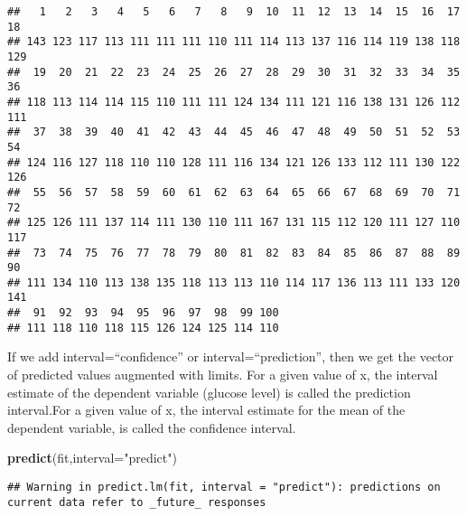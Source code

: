 \documentclass[]{book}
\newenvironment{Shaded}{\begin{snugshade}}{\end{snugshade}}
\newcommand{\KeywordTok}[1]{\textcolor[rgb]{0.13,0.29,0.53}{\textbf{#1}}}
\newcommand{\DataTypeTok}[1]{\textcolor[rgb]{0.13,0.29,0.53}{#1}}
\newcommand{\StringTok}[1]{\textcolor[rgb]{0.31,0.60,0.02}{#1}}
\newcommand{\NormalTok}[1]{#1}
\theoremstyle{definition}
\theoremstyle{definition}
\theoremstyle{definition}
\theoremstyle{remark}
\begin{document}
\begin{verbatim}
##   1   2   3   4   5   6   7   8   9  10  11  12  13  14  15  16  17  18 
## 143 123 117 113 111 111 111 110 111 114 113 137 116 114 119 138 118 129 
##  19  20  21  22  23  24  25  26  27  28  29  30  31  32  33  34  35  36 
## 118 113 114 114 115 110 111 111 124 134 111 121 116 138 131 126 112 111 
##  37  38  39  40  41  42  43  44  45  46  47  48  49  50  51  52  53  54 
## 124 116 127 118 110 110 128 111 116 134 121 126 133 112 111 130 122 126 
##  55  56  57  58  59  60  61  62  63  64  65  66  67  68  69  70  71  72 
## 125 126 111 137 114 111 130 110 111 167 131 115 112 120 111 127 110 117 
##  73  74  75  76  77  78  79  80  81  82  83  84  85  86  87  88  89  90 
## 111 134 110 113 138 135 118 113 113 110 114 117 136 113 111 133 120 141 
##  91  92  93  94  95  96  97  98  99 100 
## 111 118 110 118 115 126 124 125 114 110
\end{verbatim}

If we add interval=``confidence'' or interval=``prediction'', then we
get the vector of predicted values augmented with limits. For a given
value of x, the interval estimate of the dependent variable (glucose
level) is called the prediction interval.For a given value of x, the
interval estimate for the mean of the dependent variable, is called the
confidence interval.

\begin{Shaded}
\begin{Highlighting}[]
\KeywordTok{predict}\NormalTok{(fit,}\DataTypeTok{interval=}\StringTok{"predict"}\NormalTok{)}
\end{Highlighting}
\end{Shaded}

\begin{verbatim}
## Warning in predict.lm(fit, interval = "predict"): predictions on current data refer to _future_ responses
\end{verbatim}
\end{document}

